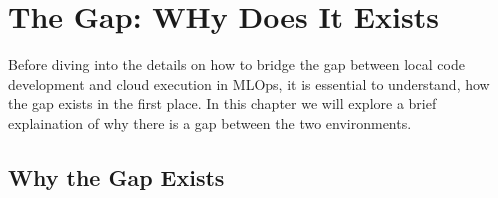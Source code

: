 \chapter{The Gap: WHy Does It Exists}\label{chapter:gap}

Before diving into the details on how to bridge the gap between local code development and cloud execution in \ac{MLOps}, it is essential to understand, how the gap exists in the first place.
In this chapter we will explore a brief explaination of why there is a gap between the two environments.

\section{Why the Gap Exists}

